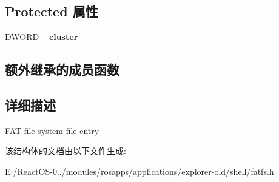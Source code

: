 \subsection*{Protected 属性}
\begin{DoxyCompactItemize}
\item 
\mbox{\label{struct_f_a_t_entry_ac9c200fde61c1929f9ae09c7ae530197}} 
D\+W\+O\+RD {\bfseries \+\_\+cluster}
\end{DoxyCompactItemize}
\subsection*{额外继承的成员函数}


\subsection{详细描述}
F\+AT file system file-\/entry 

该结构体的文档由以下文件生成\+:\begin{DoxyCompactItemize}
\item 
E\+:/\+React\+O\+S-\/0../modules/rosapps/applications/explorer-\/old/shell/fatfs.\+h\end{DoxyCompactItemize}
